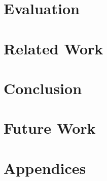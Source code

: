 \documentclass[11pt]{article}
\begin{document}
\begin{multicols}{2}
\section{Evaluation}



\section{Related Work}


\section{Conclusion}


\section{Future Work}


\section{Appendices}

\end{multicols}
\newpage





\nocite{*}
\end{document}
